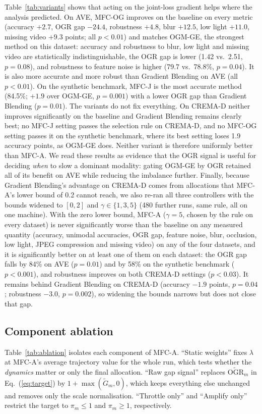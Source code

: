 \documentclass[fleqn,10pt]{wlscirep}
\newcommand{\OGR}{\mathrm{OGR}}
\begin{document}
Table~\ref{tab:variants} shows that acting on the joint-loss gradient helps where the analysis predicted. On AVE, MFC-OG improves on the baseline on every metric (accuracy $+2.7$, OGR gap $-24.4$, robustness $+4.8$, blur $+12.5$, low light $+11.0$, missing video $+9.3$ points; all $p<0.01$) and matches OGM-GE, the strongest method on this dataset: accuracy and robustness to blur, low light and missing video are statistically indistinguishable, the OGR gap is lower (1.42 vs.\ 2.51, $p{=}0.08$), and robustness to feature noise is higher (79.7 vs.\ 78.8\%, $p{=}0.04$). It is also more accurate and more robust than Gradient Blending on AVE (all $p<0.01$). On the synthetic benchmark, MFC-J is the most accurate method (84.5\%; $+1.9$ over OGM-GE, $p{=}0.001$) with a lower OGR gap than Gradient Blending ($p{=}0.01$). The variants do not fix everything. On CREMA-D neither improves significantly on the baseline and Gradient Blending remains clearly best; no MFC-J setting passes the selection rule on CREMA-D, and no MFC-OG setting passes it on the synthetic benchmark, where its best setting loses 1.9 accuracy points, as OGM-GE does. Neither variant is therefore uniformly better than MFC-A. We read these results as evidence that the OGR signal is useful for deciding \emph{when} to slow a dominant modality: gating OGM-GE by OGR retained all of its benefit on AVE while reducing the imbalance further. Finally, because Gradient Blending's advantage on CREMA-D comes from allocations that MFC-A's lower bound of 0.2 cannot reach, we also re-ran all three controllers with the bounds widened to $[0,2]$ and $\gamma\in\{1,3,5\}$ (480 further runs, same rule, all on one machine). With the zero lower bound, MFC-A ($\gamma{=}5$, chosen by the rule on every dataset) is never significantly worse than the baseline on any measured quantity (accuracy, unimodal accuracies, OGR gap, feature noise, blur, occlusion, low light, JPEG compression and missing video) on any of the four datasets, and it is significantly better on at least one of them on each dataset: the OGR gap falls by 84\% on AVE ($p{=}0.01$) and by 58\% on the synthetic benchmark ($p<0.001$), and robustness improves on both CREMA-D settings ($p<0.03$). It remains behind Gradient Blending on CREMA-D (accuracy $-1.9$ points, $p{=}0.04$; robustness $-3.0$, $p{=}0.002$), so widening the bounds narrows but does not close that gap.

\subsection*{Component ablation}
Table~\ref{tab:ablation} isolates each component of MFC-A. ``Static weights'' fixes $\lambda$ at MFC-A's average trajectory value for the whole run, which tests whether the \emph{dynamics} matter or only the final allocation. ``Raw gap signal'' replaces $\widetilde{\OGR}_m$ in Eq.~(\ref{eq:target}) by $1+\max(\tilde G_m,0)$, which keeps everything else unchanged and removes only the scale normalisation. ``Throttle only'' and ``Amplify only'' restrict the target to $\pi_m\le1$ and $\pi_m\ge1$, respectively.
\end{document}
